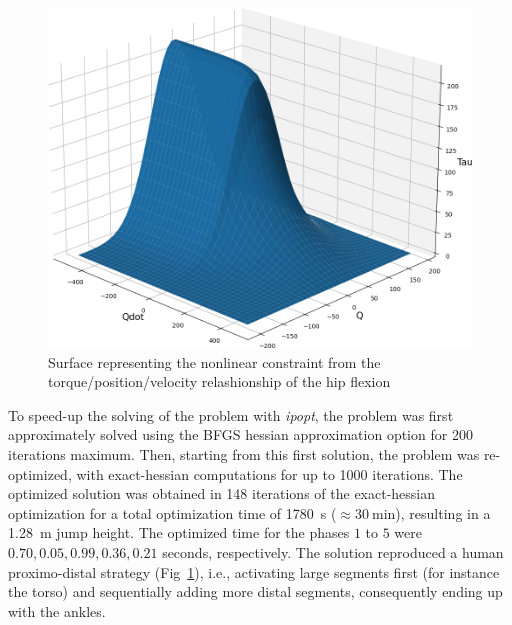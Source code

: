 \begin{figure}[h!]
\includegraphics[width=\columnwidth]{figures/torque_angle_velocity_hip_flexion}
\caption{Surface representing the nonlinear constraint from the torque/position/velocity relashionship of the hip flexion} 
\label{fig:graph_force_vitesse_longueur}
\end{figure}

To speed-up the solving of the problem with \emph{ipopt}, the problem was first approximately solved using the BFGS hessian approximation option for 200 iterations maximum.
Then, starting from this first solution, the problem was re-optimized, with exact-hessian computations for up to 1000 iterations.
The optimized solution was obtained in 148 iterations of the exact-hessian optimization for a total optimization time of \SI{1780}{\second} ($\approx\SI{30}{\minute}$), resulting in a \SI{1.28}{\meter} jump height.
The optimized time for the phases $1$ to $5$ were $0.70, 0.05, 0.99, 0.36, 0.21$ seconds, respectively.
The solution reproduced a human proximo-distal strategy (Fig~\ref{fig:graph_force_vitesse_longueur}), i.e., activating large segments first (for instance the torso) and sequentially adding more distal segments, consequently ending up with the ankles.

